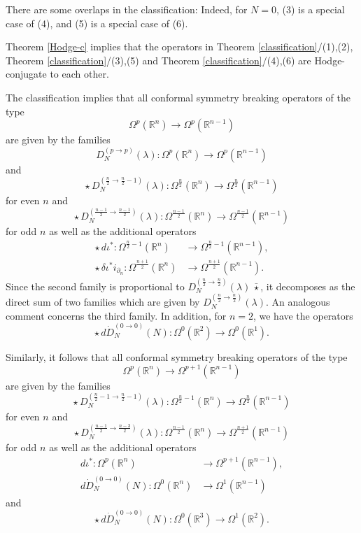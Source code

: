 \documentclass[a4paper,12pt,reqno]{amsart}
\numberwithin{theorem}{subsection}
\numberwithin{equation}{section}
\begin{document}
There are some overlaps in the classification: Indeed, for $N=0$, (3) is a
special case of (4), and (5) is a special case of (6).

Theorem \ref{Hodge-c} implies that the operators in Theorem
\ref{classification}/(1),(2), Theorem \ref{classification}/(3),(5) and Theorem
\ref{classification}/(4),(6) are Hodge-conjugate to each other.

The classification implies that all conformal symmetry breaking operators of
the type
$$
   \Omega^p({\mathbb{R}}^n) \to \Omega^p({\mathbb{R}}^{n-1})
$$
are given by the families
\begin{equation*}
   D_N^{(p \to p)}(\lambda): \Omega^p({\mathbb{R}}^n) \to \Omega^p({\mathbb{R}}^{n-1})
\end{equation*}
and
\begin{equation*}
   \star \, D_N^{(\frac{n}{2} \to \frac{n}{2}-1)}(\lambda):
   \Omega^{\frac{n}{2}}({\mathbb{R}}^n) \to \Omega^{\frac{n}{2}}({\mathbb{R}}^{n-1})
\end{equation*}
for even $n$ and
\begin{equation*}
   \star \, D_N^{(\frac{n-1}{2} \to \frac{n-1}{2})}(\lambda):
   \Omega^{\frac{n-1}{2}}({\mathbb{R}}^n) \to \Omega^{\frac{n-1}{2}}({\mathbb{R}}^{n-1})
\end{equation*}
for odd $n$ as well as the additional operators
\begin{align*}
  \star \, d \iota^*: \Omega^{\frac{n}{2}-1} ({\mathbb{R}}^n) & \to \Omega^{\frac{n}{2}-1}({\mathbb{R}}^{n-1}), \\
  \star \, \delta \iota^*i_{\partial_n}: \Omega^{\frac{n+1}{2}}({\mathbb{R}}^n) & \to
  \Omega^{\frac{n+1}{2}}({\mathbb{R}}^{n-1}).
\end{align*}
Since the second family is proportional to $D_N^{(\frac{n}{2} \to
\frac{n}{2})}(\lambda) \, \bar{\star}$, it decomposes as the direct sum of two
families which are given by $D_N^{(\frac{n}{2} \to \frac{n}{2})}(\lambda)$. An
analogous comment concerns the third family. In addition, for $n=2$, we have
the operators
$$
   \star \, d \dot{D}_N^{(0 \to 0)}(N): \Omega^0({\mathbb{R}}^2) \to \Omega^0({\mathbb{R}}^1).
$$

Similarly, it follows that all conformal symmetry breaking operators of the
type
$$
\Omega^p({\mathbb{R}}^n) \to \Omega^{p+1}({\mathbb{R}}^{n-1})
$$
are given by the families
$$
   \star \, D_N^{(\frac{n}{2}-1 \to \frac{n}{2}-1)}(\lambda):
   \Omega^{\frac{n}{2}-1}({\mathbb{R}}^n) \to \Omega^{\frac{n}{2}}({\mathbb{R}}^{n-1})
$$
for even $n$ and
$$
    \star \, D_N^{(\frac{n-1}{2} \to \frac{n-3}{2})}(\lambda):
    \Omega^{\frac{n-1}{2}}({\mathbb{R}}^n) \to \Omega^{\frac{n+1}{2}}({\mathbb{R}}^{n-1})
$$
for odd $n$ as well as the additional operators
\begin{align*}
   d \iota^*: \Omega^p({\mathbb{R}}^n) & \to \Omega^{p+1}({\mathbb{R}}^{n-1}), \\
   d \dot{D}_N^{(0 \to 0)}(N): \Omega^0({\mathbb{R}}^n) & \to \Omega^1({\mathbb{R}}^{n-1})
\end{align*}
and
$$
   \star \, d \dot{D}_N^{(0 \to 0)}(N): \Omega^0({\mathbb{R}}^3) \to \Omega^1({\mathbb{R}}^2).
$$
\end{document}
